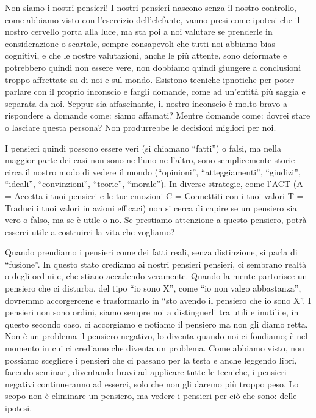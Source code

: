 \documentclass[12pt]{book} %
\begin{document}
Non siamo i nostri pensieri! I nostri pensieri nascono senza il nostro controllo, come abbiamo visto con
l'esercizio dell'elefante, vanno presi come ipotesi che il nostro cervello
porta alla luce, ma sta poi a noi valutare se prenderle in considerazione o scartale, sempre consapevoli che tutti noi
abbiamo bias cognitivi, e che le nostre valutazioni, anche le più attente, sono deformate e potrebbero quindi non
essere vere, non dobbiamo quindi giungere a conclusioni troppo affrettate su di noi e sul mondo. Esistono tecniche
ipnotiche per poter parlare con il proprio inconscio e fargli domande, come ad un'entità più saggia e separata da noi.
Seppur sia affascinante, il nostro inconscio è molto bravo a rispondere a domande come: siamo affamati? Mentre domande
come: dovrei stare o lasciare questa persona? Non produrrebbe le decisioni migliori per noi. 

I pensieri quindi possono essere veri (si chiamano “fatti”) o falsi, ma nella maggior parte dei casi non sono ne
l'uno ne l'altro, sono semplicemente storie circa il nostro modo di vedere il
mondo (“opinioni”, “atteggiamenti”, “giudizi”, “ideali”, “convinzioni”, “teorie”, “morale”). In diverse strategie, come
l'ACT (A = Accetta i tuoi pensieri e le tue emozioni C = Connettiti con i tuoi valori T = Traduci
i tuoi valori in azioni efficaci) non si cerca di capire se un pensiero sia vero o falso, ma se è utile o no. Se
prestiamo attenzione a questo pensiero, potrà esserci utile a costruirci la vita che vogliamo?

Quando prendiamo i pensieri come dei fatti reali, senza distinzione, si parla di “fusione”. In questo stato crediamo ai
nostri pensieri pensieri, ci sembrano realtà o degli ordini e, che stiano accadendo veramente. Quando la mente
partorisce un pensiero che ci disturba, del tipo “io sono X”, come “io non valgo abbastanza”, dovremmo accorgercene e
trasformarlo in “sto avendo il pensiero che io sono X”. I pensieri non sono ordini, siamo sempre noi a distinguerli tra
utili e inutili e, in questo secondo caso, ci accorgiamo e notiamo il pensiero ma non gli diamo retta. Non è un
problema il pensiero negativo, lo diventa quando noi ci fondiamo; è nel momento in cui ci crediamo che diventa un
problema. Come abbiamo visto, non possiamo scegliere i pensieri che ci passano per la testa e anche leggendo libri,
facendo seminari, diventando bravi ad applicare tutte le tecniche, i pensieri negativi continueranno ad esserci, solo
che non gli daremo più troppo peso. Lo scopo non è eliminare un pensiero, ma vedere i pensieri per ciò che sono: delle
ipotesi. 
\end{document}
